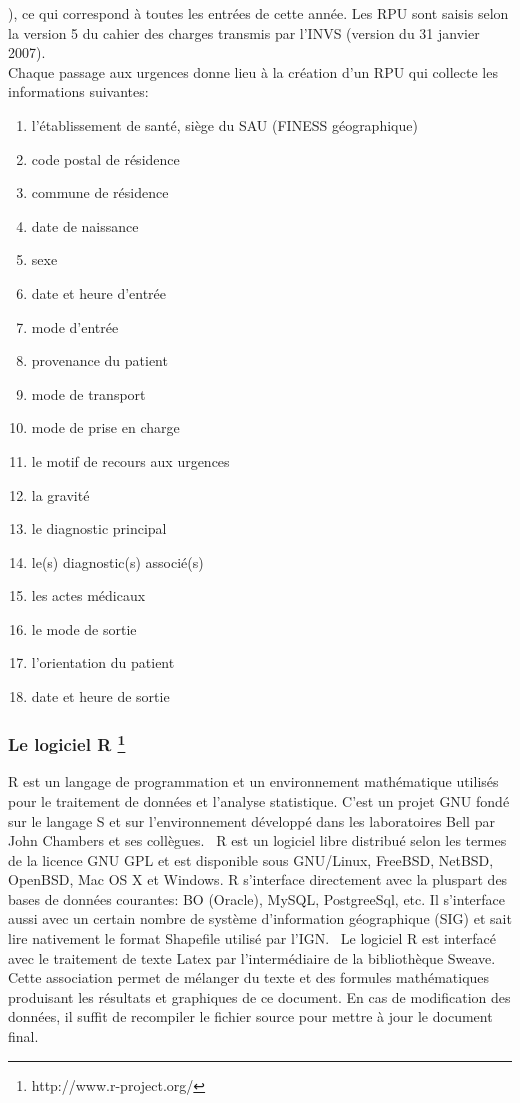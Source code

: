 \documentclass[12pt,english,french]{report}\usepackage{graphicx, color}
\begin{document}
{\ttfamily\noindent\bfseries\color{errorcolor}{\\Error in eval(expr, envir, enclos) : objet 'd2' introuvable}}), ce qui correspond à toutes les entrées de cette année. Les RPU sont saisis selon la version 5 du cahier des charges transmis par l'INVS (version du 31 janvier 2007).
\\
Chaque passage aux urgences donne lieu à la création d'un RPU qui collecte les informations suivantes:
\begin{enumerate}
  \item l'établissement de santé, siège du SAU (FINESS géographique)
  \item code postal de résidence
  \item commune de résidence
  \item date de naissance
  \item sexe
  \item date et heure d'entrée
  \item mode d'entrée
  \item provenance du patient
  \item mode de transport
  \item mode de prise en charge
  \item le motif de recours aux urgences
  \item la gravité
  \item le diagnostic principal
  \item le(s) diagnostic(s) associé(s)
  \item les actes médicaux
  \item le mode de sortie
  \item l'orientation du patient
  \item date et heure de sortie
\end{enumerate}


\subsubsection*{Le logiciel R \footnote{http://www.r-project.org/}}

R est un langage de programmation et un environnement mathématique utilisés pour le traitement de données et l'analyse statistique. C'est un projet GNU fondé sur le langage S et sur l'environnement développé dans les laboratoires Bell par John Chambers et ses collègues. 
\
R est un logiciel libre distribué selon les termes de la licence GNU GPL et est disponible sous GNU/Linux, FreeBSD, NetBSD, OpenBSD, Mac OS X et Windows. R s'interface directement avec la pluspart des bases de données courantes: BO (Oracle), MySQL, PostgreeSql, etc. Il s'interface aussi avec un certain nombre de système d'information géographique (SIG) et sait lire nativement le format Shapefile utilisé par l'IGN.
\
Le logiciel R est interfacé avec le traitement de texte Latex par l'intermédiaire de la bibliothèque Sweave. Cette association permet de mélanger du texte et des formules mathématiques produisant les résultats et graphiques de ce document. En cas de modification des données, il suffit de recompiler le fichier source pour mettre à jour le document final.
\end{document}
